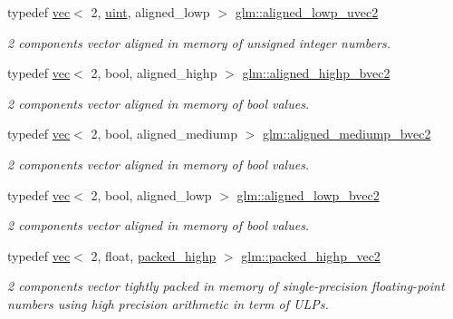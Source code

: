 \begin{DoxyCompactItemize}
typedef \mbox{\hyperlink{structglm_1_1vec}{vec}}$<$ 2, \mbox{\hyperlink{group__core__precision_ga4fd29415871152bfb5abd588334147c8}{uint}}, aligned\+\_\+lowp $>$ \mbox{\hyperlink{group__gtc__type__aligned_gabd374d47967c0eefc8b98a405d064cc6}{glm\+::aligned\+\_\+lowp\+\_\+uvec2}}
\begin{DoxyCompactList}\small\item\em 2 components vector aligned in memory of unsigned integer numbers. \end{DoxyCompactList}\item 
typedef \mbox{\hyperlink{structglm_1_1vec}{vec}}$<$ 2, bool, aligned\+\_\+highp $>$ \mbox{\hyperlink{group__gtc__type__aligned_gafa71bded1fc2dd68608207de49a96870}{glm\+::aligned\+\_\+highp\+\_\+bvec2}}
\begin{DoxyCompactList}\small\item\em 2 components vector aligned in memory of bool values. \end{DoxyCompactList}\item 
typedef \mbox{\hyperlink{structglm_1_1vec}{vec}}$<$ 2, bool, aligned\+\_\+mediump $>$ \mbox{\hyperlink{group__gtc__type__aligned_gae5c5d40c3d652a0f882f5f634914cfc9}{glm\+::aligned\+\_\+mediump\+\_\+bvec2}}
\begin{DoxyCompactList}\small\item\em 2 components vector aligned in memory of bool values. \end{DoxyCompactList}\item 
typedef \mbox{\hyperlink{structglm_1_1vec}{vec}}$<$ 2, bool, aligned\+\_\+lowp $>$ \mbox{\hyperlink{group__gtc__type__aligned_ga8118d4ac245590bb8c4dfcad9b7632ee}{glm\+::aligned\+\_\+lowp\+\_\+bvec2}}
\begin{DoxyCompactList}\small\item\em 2 components vector aligned in memory of bool values. \end{DoxyCompactList}\item 
typedef \mbox{\hyperlink{structglm_1_1vec}{vec}}$<$ 2, float, \mbox{\hyperlink{namespaceglm_a36ed105b07c7746804d7fdc7cc90ff25a8e8791ee77fe079b1291f710d88031bf}{packed\+\_\+highp}} $>$ \mbox{\hyperlink{group__gtc__type__aligned_ga15068ebf3dae2c205d90b1d36780bf9b}{glm\+::packed\+\_\+highp\+\_\+vec2}}
\begin{DoxyCompactList}\small\item\em 2 components vector tightly packed in memory of single-\/precision floating-\/point numbers using high precision arithmetic in term of U\+L\+Ps. \end{DoxyCompactList}\item 

\end{DoxyCompactItemize}
